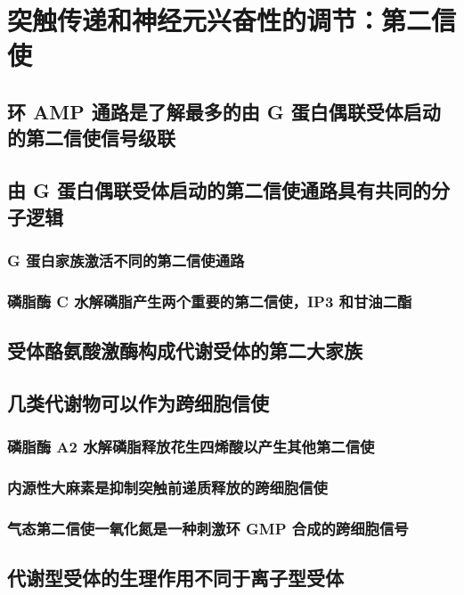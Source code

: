 \chapter{突触传递和神经元兴奋性的调节：第二信使}

\section{环 AMP 通路是了解最多的由 G 蛋白偶联受体启动的第二信使信号级联}

\section{由 G 蛋白偶联受体启动的第二信使通路具有共同的分子逻辑}
\subsection{G 蛋白家族激活不同的第二信使通路}
\subsection{磷脂酶 C 水解磷脂产生两个重要的第二信使，IP3 和甘油二酯}

\section{受体酪氨酸激酶构成代谢受体的第二大家族}

\section{几类代谢物可以作为跨细胞信使}

\subsection{磷脂酶 A2 水解磷脂释放花生四烯酸以产生其他第二信使}
\subsection{内源性大麻素是抑制突触前递质释放的跨细胞信使}
\subsection{气态第二信使一氧化氮是一种刺激环 GMP 合成的跨细胞信号}

\section{代谢型受体的生理作用不同于离子型受体}

